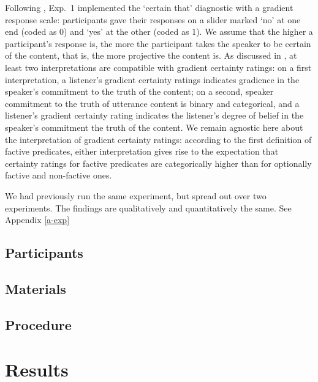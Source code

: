 \documentclass[11pt,fleqn]{article}
\newcommand{\6}{\mbox{$[\hspace*{-.6mm}[$}}
\newcommand{\9}{\mbox{$]\hspace*{-.6mm}]$}}
\begin{document}
Following \citealt{tbd-variability}, Exp.~1 implemented the `certain that' diagnostic with a gradient response scale: participants gave their responses on a slider marked `no' at one end (coded as 0) and `yes' at the other (coded as 1). We assume that the higher a participant's response is, the more the participant takes the speaker to be certain of the content, that is, the more projective the content is. As discussed in \citealt{tbd-variability}, at least two interpretations are compatible with gradient certainty ratings: on a first interpretation, a listener's gradient certainty ratings indicates gradience in the speaker's commitment to the truth of the content; on a second, speaker commitment to the truth of utterance content is binary and categorical, and a listener's gradient certainty rating indicates the listener's degree of belief in the speaker's commitment the truth of the content. We remain agnostic here about the interpretation of gradient certainty ratings:  according to the first definition of factive predicates, either interpretation gives rise to the expectation that certainty ratings for factive predicates are categorically higher than for optionally factive and non-factive ones.

We had previously run the same experiment, but spread out over two experiments. The findings are qualitatively and quantitatively the same. See Appendix \ref{a-exp}

\subsection{Participants}

\subsection{Materials}

\subsection{Procedure}

\section{Results}\label{s3}

 
\end{document}
